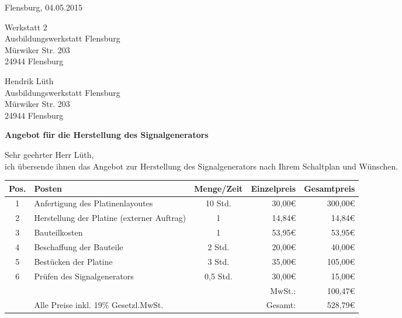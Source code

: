 \documentclass[a4paper,12pt]{article}
\begin{document}
\pagebreak
Flensburg, 04.05.2015
\begin{flushright}
Werkstatt 2\\
Ausbildungswerkstatt Flensburg\\
Mürwiker Str. 203\\
24944 Flensburg
\end{flushright}
\bigskip
\bigskip
\bigskip
Hendrik Lüth\\
Ausbildungswerkstatt Flensburg\\
Mürwiker Str. 203\\
24944 Flensburg\\
\begin{flushleft}
\bigskip

\textbf{Angebot für die Herstellung des Signalgenerators}
\bigskip
\bigskip

Sehr geehrter Herr Lüth,\\
\bigskip
ich übersende ihnen das Angebot zur Herstellung des Signalgenerators nach Ihrem Schaltplan und Wünschen.\\
\medskip

\begin{tabular}{cp{7cm}cr|r|}
\hline
\multicolumn{1}{|l|}{Pos.} & \multicolumn{1}{l|}{Posten} & \multicolumn{1}{l|}{Menge/Zeit} & Einzelpreis & Gesamtpreis \\ \hline
\multicolumn{1}{|c|}{1} & \multicolumn{1}{l|}{Anfertigung des Platinenlayoutes} & \multicolumn{1}{c|}{10 Std.} & 30,00\euro & 300,00\euro \\ \hline
\multicolumn{1}{|c|}{2} & \multicolumn{1}{l|}{Herstellung der Platine (externer Auftrag)} & \multicolumn{1}{c|}{1} & 14,84\euro & 14,84\euro \\ \hline
\multicolumn{1}{|c|}{3} & \multicolumn{1}{l|}{Bauteilkosten} & \multicolumn{1}{c|}{1} & 53,95\euro & 53,95\euro \\ \hline
\multicolumn{1}{|c|}{4} & \multicolumn{1}{l|}{Beschaffung der Bauteile} & \multicolumn{1}{c|}{2 Std.} & 20,00\euro & 40,00\euro \\ \hline
\multicolumn{1}{|c|}{5} & \multicolumn{1}{l|}{Bestücken der Platine} & \multicolumn{1}{c|}{3 Std.} & 35,00\euro & 105,00\euro \\ \hline
\multicolumn{1}{|c|}{6} & \multicolumn{1}{l|}{Prüfen des Signalgenerators} & \multicolumn{1}{c|}{0,5 Std.} & 30,00\euro & 15,00\euro \\ \hline
 & & & MwSt.: & 100,47\euro \\ \cline{5-5}
                       & Alle Preise inkl. 19\% Gesetzl.MwSt. &                       & Gesamt: & 528,79\euro \\ \cline{5-5} 
\end{tabular}\\
\bigskip


\end{flushleft}
\end{document}
